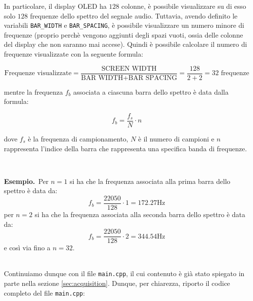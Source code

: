 \documentclass[a4paper,12pt]{report}  %
\newcommand{\namedparagraph}[2]{%
    \noindent\colorbox{cyan!20}{\parbox{\dimexpr\linewidth-2\fboxsep}{\textbf{#1}~#2}}%
}
\newcommand{\lstinlinebg}[1]{\colorbox{backcolour}{\lstinline|#1|}}
\begin{document}
In particolare, il display OLED ha $128$ colonne, è possibile visualizzare su di esso solo $128$ frequenze dello spettro del segnale audio.
Tuttavia, avendo definito le variabili \lstinlinebg{BAR_WIDTH} e \lstinlinebg{BAR_SPACING}, è possibile visualizzare un numero minore di frequenze (proprio perchè vengono aggiunti degli spazi vuoti, ossia delle colonne del display che non saranno mai accese).
Quindi è possibile calcolare il numero di frequenze visualizzate con la seguente formula:

\begin{equation}
    \text{Frequenze visualizzate} = \frac{\text{SCREEN WIDTH}}{\text{BAR WIDTH} + \text{BAR SPACING}} = \frac{128}{2 + 2} = 32 \text{ frequenze} \nonumber
\end{equation}

mentre la frequenza $f_b$ associata a ciascuna barra dello spettro è data dalla formula:

\begin{equation}
    f_b = \frac{f_s}{N} \cdot n \nonumber
\end{equation}

dove $f_s$ è la frequenza di campionamento, $N$ è il numero di campioni e $n$ rappresenta l'indice della barra che rappresenta una specifica banda di frequenze.

\noindent\\ \namedparagraph{Esempio.}{Per $n = 1$ si ha che la frequenza associata alla prima barra dello spettro è data da:
\begin{equation}
    f_b = \frac{22050}{128} \cdot 1 = 172.27 \text{Hz} \nonumber
\end{equation}
per $n = 2$ si ha che la frequenza associata alla seconda barra dello spettro è data da:
\begin{equation}
    f_b = \frac{22050}{128} \cdot 2 = 344.54 \text{Hz} \nonumber
\end{equation}
e così via fino a $n = 32$.}

\noindent\\ Continuiamo dunque con il file \lstinlinebg{main.cpp}, il cui contenuto è già stato spiegato in parte nella sezione \ref{sec:acquisition}.
Dunque, per chiarezza, riporto il codice completo del file \lstinlinebg{main.cpp}:
\end{document}
